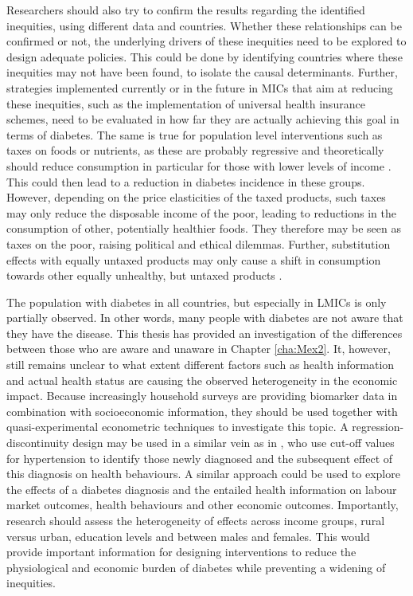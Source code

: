 Researchers should also try to confirm the results regarding the identified inequities, using different data and countries. Whether these relationships can be confirmed or not, the underlying drivers of these inequities need to be explored to design adequate policies. This could be done by identifying countries where these inequities may not have been found, to isolate the causal determinants. Further, strategies implemented currently or in the future in \acp{MIC} that aim at reducing these inequities, such as the implementation of universal health insurance schemes, need to be evaluated in how far they are actually achieving this goal in terms of diabetes. The same is true for population level interventions such as taxes on foods or nutrients, as these are probably regressive and theoretically should reduce consumption in particular for those with lower levels of income \parencite{Mytton2012c}. This could then lead to a reduction in diabetes incidence in these groups. However, depending on the price elasticities of the taxed products, such taxes may only reduce the disposable income of the poor, leading to reductions in the consumption of other, potentially healthier foods. They therefore may be seen as taxes on the poor, raising political and ethical dilemmas. Further, substitution effects with equally untaxed products may only cause a shift in consumption towards other equally unhealthy, but untaxed products \parencite{Mytton2012c}.

The population with diabetes in all countries, but especially in \acp{LMIC} is only partially observed. In other words, many people with diabetes are not aware that they have the disease. This thesis has provided an investigation of the differences between those who are aware and unaware in Chapter \ref{cha:Mex2}. It, however, still remains unclear to what extent different factors such as health information and actual health status are causing the observed heterogeneity in the economic impact. Because increasingly household surveys are providing biomarker data in combination with socioeconomic information, they should be used together with quasi-experimental econometric techniques to investigate this topic. A regression-discontinuity design may be used in a similar vein as in \textcite{Zhao2013a}, who use cut-off values for hypertension to identify those newly diagnosed and the subsequent effect of this diagnosis on health behaviours. A similar approach could be used to explore the effects of a diabetes diagnosis and the entailed health information on labour market outcomes, health behaviours and other economic outcomes. Importantly, research should assess the heterogeneity of effects across income groups, rural versus urban, education levels and between males and females. This would provide important information for designing interventions to reduce the physiological and economic burden of diabetes while preventing a widening of inequities.

